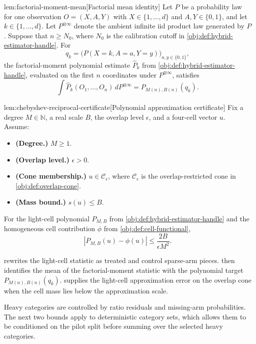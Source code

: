 \begin{lemmav}{lem:factorial-moment-mean}[Factorial mean identity]
Let \(P\) be a probability law for one observation \(O=(X,A,Y)\) with \(X\in\{1,\ldots,d\}\) and \(A,Y\in\{0,1\}\), and let \(k\in\{1,\ldots,d\}\). Let \(P^{\otimes\infty}\) denote the ambient infinite iid product law generated by \(P\). Suppose that \(n\ge N_0\), where \(N_0\) is the calibration cutoff in \cref{obj:def:hybrid-estimator-handle}. For
\[
q_k=\bigl(P(X=k,A=a,Y=y)\bigr)_{a,y\in\{0,1\}},
\]
the factorial-moment polynomial estimate \(\widehat P_k\) from \cref{obj:def:hybrid-estimator-handle}, evaluated on the first \(n\) coordinates under \(P^{\otimes\infty}\), satisfies
\[
\int \widehat P_k(O_1,\ldots,O_n)\,dP^{\otimes\infty}
=
P_{M(n),B(n)}(q_k).
\]
\end{lemmav}

\begin{lemmav}{lem:chebyshev-reciprocal-certificate}[Polynomial approximation certificate]
Fix a degree \(M\in\mathbb N\), a real scale \(B\), the overlap level \(\epsilon\), and a four-cell vector \(u\). Assume:
\begin{itemize}
\item \textbf{(Degree.)} \(M\ge 1\).
\item \textbf{(Overlap level.)} \(\epsilon>0\).
\item \textbf{(Cone membership.)} \(u\in\mathcal C_\epsilon\), where \(\mathcal C_\epsilon\) is the overlap-restricted cone in \cref{obj:def:overlap-cone}.
\item \textbf{(Mass bound.)} \(s(u)\le B\).
\end{itemize}
For the light-cell polynomial \(P_{M,B}\) from \cref{obj:def:hybrid-estimator-handle} and the homogeneous cell contribution \(\phi\) from \cref{obj:def:cell-functional},
\[
\left|P_{M,B}(u)-\phi(u)\right|\le \frac{2B}{\epsilon M^2}.
\]
\end{lemmav}

 rewrites the light-cell statistic as treated and control sparse-arm pieces.  then identifies the mean of the factorial-moment statistic with the polynomial target \(P_{M(n),B(n)}(q_k)\).  supplies the light-cell approximation error on the overlap cone when the cell mass lies below the approximation scale.

Heavy categories are controlled by ratio residuals and missing-arm probabilities. The next two bounds apply to deterministic category sets, which allows them to be conditioned on the pilot split before summing over the selected heavy categories.


